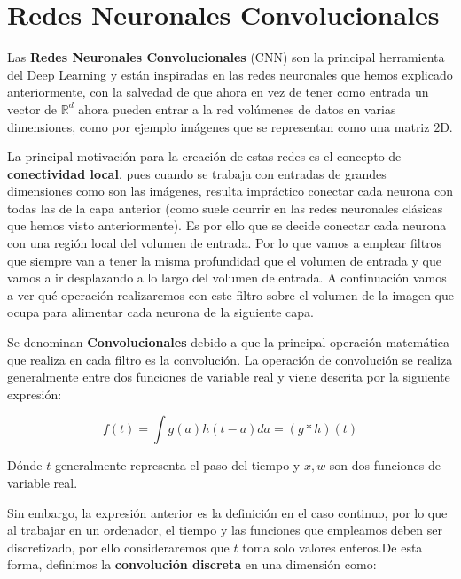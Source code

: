 \section{Redes Neuronales Convolucionales}
    \noindent Las \textbf{Redes Neuronales Convolucionales} (CNN) son la principal herramienta del Deep Learning y están inspiradas en las redes neuronales que hemos explicado anteriormente, con la salvedad de que ahora en vez de tener como entrada un vector de $\mathbb{R}^d$ ahora pueden entrar a la red volúmenes de datos en varias dimensiones, como por ejemplo imágenes que se representan como una matriz $2$D.
    
    \medskip

    \noindent La principal motivación para la creación de estas redes es el concepto de \textbf{conectividad local}, pues cuando se trabaja con entradas de grandes dimensiones como son las imágenes, resulta impráctico conectar cada neurona con todas las de la capa anterior (como suele ocurrir en las redes neuronales clásicas que hemos visto anteriormente). Es por ello que se decide conectar cada neurona con una región local del volumen de entrada. Por lo que vamos a emplear filtros que siempre van a tener la misma profundidad que el volumen de entrada y que vamos a ir desplazando a lo largo del volumen de entrada. A continuación vamos a ver qué operación realizaremos con este filtro sobre el volumen de la imagen que ocupa para alimentar cada neurona de la siguiente capa.

    \medskip

    \noindent Se denominan \textbf{Convolucionales} debido a que la principal operación matemática que realiza en cada filtro es la convolución. La operación de convolución se realiza generalmente entre dos funciones de variable real y viene descrita por la siguiente expresión:

    \begin{equation}
        f(t)=\int g(a) h(t-a) da = (g \ast h)(t)
    \end{equation}

    \noindent Dónde $t$ generalmente representa el paso del tiempo y $x,w$ son dos funciones de variable real.

    \medskip

    \noindent Sin embargo, la expresión anterior es la definición en el caso continuo, por lo que al trabajar en un ordenador, el tiempo y las funciones que empleamos deben ser discretizado, por ello consideraremos que $t$ toma solo valores enteros.De esta forma, definimos la \textbf{convolución discreta} en una dimensión como: 

